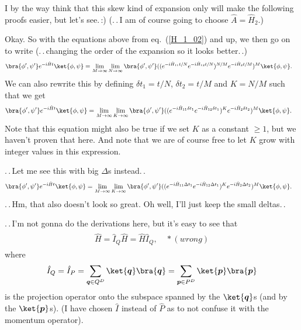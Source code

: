 \documentclass{report}
\begin{document}
I by the way think that this skew kind of expansion only will make the following proofs easier, but let's see.\,:) (.\,.\,I am of course going to choose $\hat A = \hat H_2$.)

Okay. So with the equations above from eq.\ (\ref{H_1_02}) and up, we then go on to write (.\,.\,changing the order of the expansion so it looks better.\,.)
\begin{align}
\begin{aligned}
	\bra{\phi', \psi'} e^{-i \hat H t} \ket{\phi, \psi} 
	=&\,
	\lim_{M \to \infty} \lim_{N \to \infty} 
		\bra{\phi', \psi'} (
			(e^{-i  \hat H_{11} t / N} e^{-i \hat H_{12} t / N})^{N/M}
			e^{-i  \hat H_{2} t / M}
		)^M
		\ket{\phi, \psi}.
\end{aligned}
\end{align} 
We can also rewrite this by defining $\delta t_1 = t / N$, $\delta t_2 = t / M$ and $K = N/M$ such that we get
\begin{align}
\begin{aligned}
	\bra{\phi', \psi'} e^{-i \hat H t} \ket{\phi, \psi} 
	=&\,
	\lim_{M \to \infty} \lim_{K \to \infty} 
		\bra{\phi', \psi'} (
			(e^{-i  \hat H_{11} \delta t_1 } e^{-i \hat H_{12} \delta t_1})^{K}
			e^{-i  \hat H_{2} \delta t_2}
		)^M
		\ket{\phi, \psi}.
	\label{Trotter_H_01}
\end{aligned}
\end{align} 
Note that this equation might also be true if we set $K$ as a constant $\geq 1$, but we haven't proven that here. And note that we are of course free to let $K$ grow with integer values in this expression. 

.\,.\,Let me see this with big $\Delta$s instead.\,.
\begin{align}
\begin{aligned}
	\bra{\phi', \psi'} e^{-i \hat H t} \ket{\phi, \psi} 
	=&\,
	\lim_{M \to \infty} \lim_{K \to \infty} 
		\bra{\phi', \psi'} (
			(e^{-i  \hat H_{11} \Delta t_1 } e^{-i \hat H_{12} \Delta t_1})^{K}
			e^{-i  \hat H_{2} \Delta t_2}
		)^M
		\ket{\phi, \psi}.
\end{aligned}
\end{align}
.\,.\,Hm, that also doesn't look so great. Oh well, I'll just keep the small deltas.\,. 

.\,.\,I'm not gonna do the derivations here, but it's easy to see that
\begin{align}
\begin{aligned}
	\hat H = \hat I_Q \hat H = \hat H \hat I_Q, \quad *(wrong)
\end{aligned}
\end{align}
where
\begin{align}
\begin{aligned}
	\hat I_Q = \hat I_P = 
		\sum_{\boldsymbol{q} \in Q^D} \ket{\boldsymbol{q}}\bra{\boldsymbol{q}} =
		\sum_{\boldsymbol{p} \in P^D} \ket{\boldsymbol{p}}\bra{\boldsymbol{p}}
\end{aligned}
\end{align}
is the projection operator onto the subspace spanned by the $\ket{\boldsymbol{q}}$s (and by the $\ket{\boldsymbol{p}}$s). (I have chosen $\hat I$ instead of $\hat P$ as to not confuse it with the momentum operator). 
\end{document}
